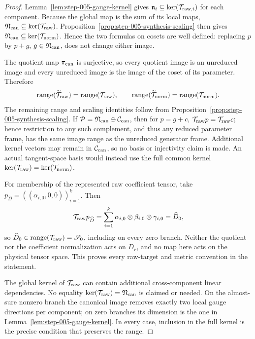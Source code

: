 \begin{proof}
Lemma~\ref{lem:step-005-gauge-kernel} gives
\(\mathfrak n_i\subseteq\ker(\mathcal T_{{\rm raw},i})\) for each component.
Because the global map is the sum of its local maps,
\(\mathfrak N_{\rm can}\subseteq\ker(\mathcal T_{\rm raw})\).
Proposition~\ref{prop:step-005-synthesis-scaling} then gives
\(\mathfrak N_{\rm can}\subseteq\ker(\mathcal T_{\rm norm})\). Hence
the two formulas on cosets are well defined: replacing \(p\) by \(p+g\),
\(g\in\mathfrak N_{\rm can}\), does not change either image.

The quotient map \(\pi_{\rm can}\) is surjective, so every quotient image is an
unreduced image and every unreduced image is the image of the coset of its
parameter. Therefore
\[
  \operatorname{range}(\widetilde{\mathcal T}_{\rm raw})
  =\operatorname{range}(\mathcal T_{\rm raw}),
  \qquad
  \operatorname{range}(\widetilde{\mathcal T}_{\rm norm})
  =\operatorname{range}(\mathcal T_{\rm norm}).
\]
The remaining range and scaling identities follow from
Proposition~\ref{prop:step-005-synthesis-scaling}. If
\(\mathcal P=\mathfrak N_{\rm can}\oplus\mathcal C_{\rm can}\), then for
\(p=g+c\),
\(\mathcal T_{\rm raw}p=\mathcal T_{\rm raw}c\); hence restriction to any
such complement, and thus any reduced parameter frame, has the same image
range as the unreduced generator frame. Additional kernel vectors may remain
in \(\mathcal C_{\rm can}\), so no basis or injectivity claim is made. An
actual tangent-space basis would instead use the full common kernel
\(\ker(\mathcal T_{\rm raw})=\ker(\mathcal T_{\rm norm})\).

For membership of the represented raw coefficient tensor, take
\(p_{\widehat D}=((\alpha_{i,0},0,0))_{i=1}^k\). Then
\[
  \mathcal T_{\rm raw}p_{\widehat D}
  =\sum_{i=1}^k
    \alpha_{i,0}\otimes\beta_{i,0}\otimes\gamma_{i,0}
  =\widehat D_0,
\]
so \(\widehat D_0\in\operatorname{range}(\mathcal T_{\rm raw})=\mathscr S_0\),
including on every zero branch. Neither the quotient nor the coefficient
normalization acts on \(D_r\), and no map here acts on the physical
tensor space. This proves every raw-target and metric convention in the
statement. 

The global kernel of \(\mathcal T_{\rm raw}\) can contain additional
cross-component linear dependencies. No equality
\(\ker(\mathcal T_{\rm raw})=\mathfrak N_{\rm can}\) is claimed or needed.
On the almost-sure nonzero branch the canonical image removes exactly two
local gauge directions per component; on zero branches its dimension is the
one in Lemma~\ref{lem:step-005-gauge-kernel}. In every case, inclusion in the
full kernel is the precise condition that preserves the range.

\end{proof}

